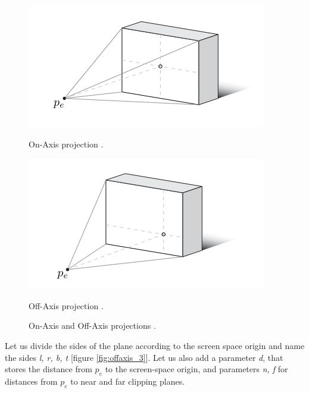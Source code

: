 \documentclass[a4paper]{report}
\begin{document}
 
 
\begin{figure}[H]
\centering
\begin{minipage}{.5\textwidth}
    \includegraphics[width=\linewidth, keepaspectratio]{images/Scemas/on_axis.png}
    \caption{On-Axis projection \cite{offaxisKooima}.}
    \label{fig:on_axis}
\end{minipage}%
\begin{minipage}{.5\textwidth}
    \includegraphics[width=\linewidth, keepaspectratio]{images/Scemas/off_axis.png}
    \caption{Off-Axis projection \cite{offaxisKooima}.}
   \label{fig:off_axis}
\end{minipage}%
\caption{On-Axis and Off-Axis projections \cite{offaxisKooima}.}
\label{fig:offaxis_1}
\end{figure}


  Let us divide the sides of the plane according to the screen space origin and name the sides \textit{l, r, b, t} [figure \ref{fig:offaxis_3}]. Let us also add a parameter \textit{d}, that stores the distance from $p_e$ to the screen-space origin, and parameters  \textit{n, f} for distances from $p_e$ to near and far clipping planes.
  
\end{document}

